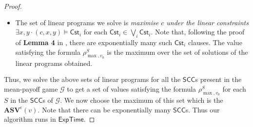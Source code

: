 \begin{proof}
\begin{enumerate}
\begin{itemize}
      \item The set of linear programs we solve is \textit{maximise $c$ under the linear constraints $\exists x, y \cdot (c,x,y) \models \mathsf{Cst}_i$} for each $\mathsf{Cst}_i \in \bigvee_i \mathsf{Cst}_i$. Note that, following the proof of \textbf{Lemma 4} in \cite{BR15}, there are exponentially many such $\mathsf{Cst}_i$ clauses. The value satisfying the formula $\rho^S_{\max,v_0}$ is the maximum over the set of solutions of the linear programs obtained.
\end{itemize}
\end{enumerate}

Thus, we solve the above sets of linear programs for all the $\mathsf{SCC}$s present in the mean-payoff game $\mathcal{G}$ to get a set of values satisfying the formula $\rho^S_{\max,v_0}$ for each $S$ in the $\mathsf{SCC}$s of $\mathcal{G}$. We now choose the maximum of this set
which is the $\mathbf{ASV}^{\epsilon}(v)$. Note that 
there can be exponentially many $\mathsf{SCC}$s.
Thus our algorithm runs in $\mathsf{ExpTime}$.
\end{proof}

